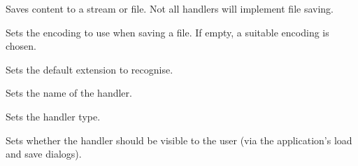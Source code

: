 
Saves content to a stream or file. Not all handlers will implement file saving.

\label{wxrichtextfilehandlersetencoding}


Sets the encoding to use when saving a file. If empty, a suitable encoding is chosen.

\label{wxrichtextfilehandlersetextension}


Sets the default extension to recognise.

\label{wxrichtextfilehandlersetname}


Sets the name of the handler.

\label{wxrichtextfilehandlersettype}


Sets the handler type.

\label{wxrichtextfilehandlersetvisible}


Sets whether the handler should be visible to the user (via the application's load and save
dialogs).


